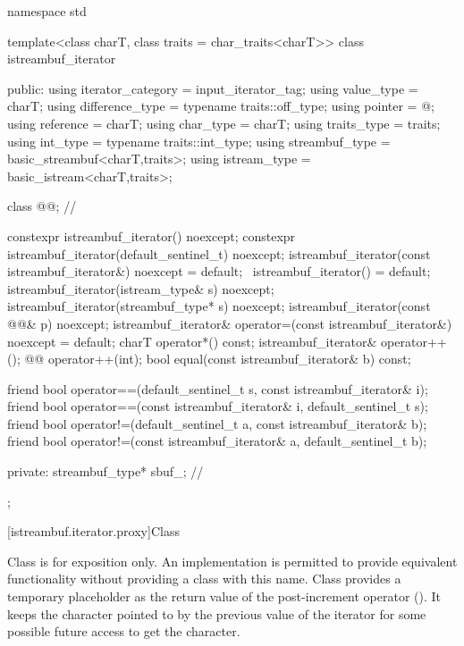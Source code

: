 %
\begin{codeblock}
namespace std {
  template<class charT, class traits = char_traits<charT>>
  class istreambuf_iterator {
  public:
    using iterator_category = input_iterator_tag;
    using value_type        = charT;
    using difference_type   = typename traits::off_type;
    using pointer           = @\unspec@;
    using reference         = charT;
    using char_type         = charT;
    using traits_type       = traits;
    using int_type          = typename traits::int_type;
    using streambuf_type    = basic_streambuf<charT,traits>;
    using istream_type      = basic_istream<charT,traits>;

    class @@;                          // \expos

    constexpr istreambuf_iterator() noexcept;
    constexpr istreambuf_iterator(default_sentinel_t) noexcept;
    istreambuf_iterator(const istreambuf_iterator&) noexcept = default;
    ~istreambuf_iterator() = default;
    istreambuf_iterator(istream_type& s) noexcept;
    istreambuf_iterator(streambuf_type* s) noexcept;
    istreambuf_iterator(const @@& p) noexcept;
    istreambuf_iterator& operator=(const istreambuf_iterator&) noexcept = default;
    charT operator*() const;
    istreambuf_iterator& operator++();
    @@ operator++(int);
    bool equal(const istreambuf_iterator& b) const;

    friend bool operator==(default_sentinel_t s, const istreambuf_iterator& i);
    friend bool operator==(const istreambuf_iterator& i, default_sentinel_t s);
    friend bool operator!=(default_sentinel_t a, const istreambuf_iterator& b);
    friend bool operator!=(const istreambuf_iterator& a, default_sentinel_t b);

  private:
    streambuf_type* sbuf_;                // \expos
  };
}
\end{codeblock}

[istreambuf.iterator.proxy]{Class }

\pnum
Class
is for exposition only.
An implementation is permitted to provide equivalent functionality without
providing a class with this name.
Class
provides a temporary
placeholder as the return value of the post-increment operator
().
It keeps the character pointed to by the previous value
of the iterator for some possible future access to get the character.

